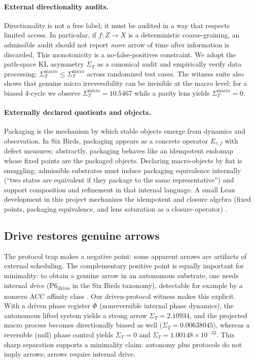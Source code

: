 \documentclass[11pt]{article}
\theoremstyle{definition}
\theoremstyle{remark}
\newcommand{\PDSigmaLiftDrive}{2.10934}
\newcommand{\PDSigmaProjDrive}{0.00638045}
\newcommand{\PDSigmaLiftNull}{0}
\newcommand{\PDSigmaProjNull}{\ensuremath{1.00148\times 10^{-32}}}
\newcommand{\HISigmaMicro}{10.5467}
\newcommand{\HISigmaMacro}{0}
\begin{document}
\paragraph{External directionality audits.}
Directionality is not a free label; it must be audited in a way that respects limited access.
In particular, if $f:Z\to X$ is a deterministic coarse-graining, an admissible audit should not report \emph{more} arrow of time after information is discarded.
This monotonicity is a no-false-positives constraint.
We adopt the path-space KL asymmetry $\Sigma_T$ as a canonical audit \citep{kullback1951,cover2006} and empirically verify data processing: $\Sigma_T^{\mathrm{macro}}\le \Sigma_T^{\mathrm{micro}}$ across randomized test cases.
The witness suite also shows that genuine micro irreversibility can be invisible at the macro level: for a biased 4-cycle we observe $\Sigma_T^{\mathrm{micro}}=\HISigmaMicro$ while a parity lens yields $\Sigma_T^{\mathrm{macro}}=\HISigmaMacro$.

\paragraph{Externally declared quotients and objects.}
Packaging is the mechanism by which stable objects emerge from dynamics and observation.
In Six Birds, packaging appears as a concrete operator $E_{\tau,f}$ with defect measures; abstractly, packaging behaves like an idempotent endomap whose fixed points are the packaged objects.
Declaring macro-objects by fiat is smuggling; admissible substrates must induce packaging equivalence internally (``two states are equivalent if they package to the same representative'') and support composition and refinement in that internal language.
A small Lean development in this project mechanizes the idempotent and closure algebra (fixed points, packaging equivalence, and lens saturation as a closure operator) \citep{demoura2021lean4,mathlib2020}.

\subsection{Drive restores genuine arrows}

The protocol trap makes a negative point: some apparent arrows are artifacts of external scheduling.
The complementary positive point is equally important for minimality:
to obtain a genuine arrow in an autonomous substrate, one needs internal \emph{drive} (P6\textsubscript{drive} in the Six Birds taxonomy), detectable for example by a nonzero ACC affinity class \citep{schnakenberg1976,seifert2012}.
Our driven-protocol witness makes this explicit.
With a driven phase register $\Phi$ (nonreversible internal phase dynamics), the autonomous lifted system yields a strong arrow $\Sigma_T=\PDSigmaLiftDrive$, and the projected macro process becomes directionally biased as well ($\Sigma_T=\PDSigmaProjDrive$), whereas a reversible (null) phase control yields $\Sigma_T=\PDSigmaLiftNull$ and $\Sigma_T=\PDSigmaProjNull$.
This sharp separation supports a minimality claim: autonomy plus protocols do not imply arrows; arrows require internal drive.
\end{document}
